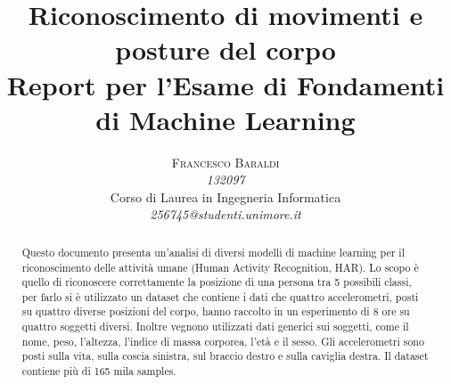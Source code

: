\documentclass[10pt,a4paper]{article}
\begin{document}
\title{Riconoscimento di movimenti e posture del corpo \\
\Large{Report per l'Esame di Fondamenti di Machine Learning}
} %

\author{\textsc{Francesco Baraldi} \\
    \emph{132097} \\
    Corso di Laurea in Ingegneria Informatica\\
    \emph{256745@studenti.unimore.it}
  }

\date{}

\maketitle %

\begin{abstract}
\normalsize
Questo documento presenta un'analisi di diversi modelli di machine learning per il riconoscimento delle attività umane (Human Activity Recognition, HAR). Lo scopo è quello di riconoscere correttamente la posizione di una persona tra 5 possibili classi, per farlo si è utilizzato un dataset che contiene i dati che quattro accelerometri, posti su quattro diverse posizioni del corpo, hanno raccolto in un esperimento di 8 ore su quattro soggetti diversi. Inoltre vegnono utilizzati dati generici sui soggetti, come il nome, peso, l'altezza, l'indice di massa corporea, l'età e il sesso. Gli accelerometri sono posti sulla vita, sulla coscia sinistra, sul braccio destro e sulla caviglia destra. Il dataset contiene più di 165 mila samples.

\end{abstract}








{}

\end{document}
